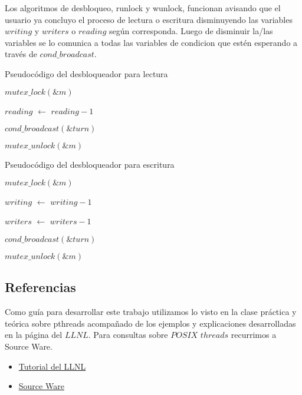 Los algoritmos de desbloqueo, runlock y wunlock, funcionan avisando que el usuario ya concluyo el proceso de lectura o escritura disminuyendo las variables $writing$ y $writers$ o $reading$ según corresponda. Luego de disminuir la/las variables se lo comunica a todas las variables de condicion que estén esperando a través de $cond\_broadcast$.

\begin{algorithm}[H]
  \begin{algorithmic}[1]
  \caption{Pseudocódigo del desbloqueador para lectura}
  \label{algo:3-1}
	\State $mutex\_lock(\&m)$

	\State $reading$ $\leftarrow$ $reading - 1$
	
	\State $cond\_broadcast(\&turn)$

	\State $mutex\_unlock(\&m)$

	\EndProcedure
	\end{algorithmic}
\end{algorithm}

\begin{algorithm}[H]
  \begin{algorithmic}[1]
  \caption{Pseudocódigo del desbloqueador para escritura}
  \label{algo:3-1}
	\State $mutex\_lock(\&m)$

	\State $writing$ $\leftarrow$ $writing - 1$
	
	\State $writers$ $\leftarrow$ $writers - 1$
	
	\State $cond\_broadcast(\&turn)$

	\State $mutex\_unlock(\&m)$

	\EndProcedure
	\end{algorithmic}
\end{algorithm}


\subsection{Referencias}

Como guía para desarrollar este trabajo utilizamos lo visto en la clase práctica y teórica sobre pthreads acompañado de los ejemplos y explicaciones desarrolladas en la página  del $LLNL$. Para consultas sobre $POSIX$ $threads$ recurrimos a Source Ware.

\begin{itemize}

\item \href{https://computing.llnl.gov/tutorials/pthreads/}{Tutorial del LLNL}

\item \href{https://www.sourceware.org/pthreads-win32/manual/}{Source Ware}

\end{itemize}

